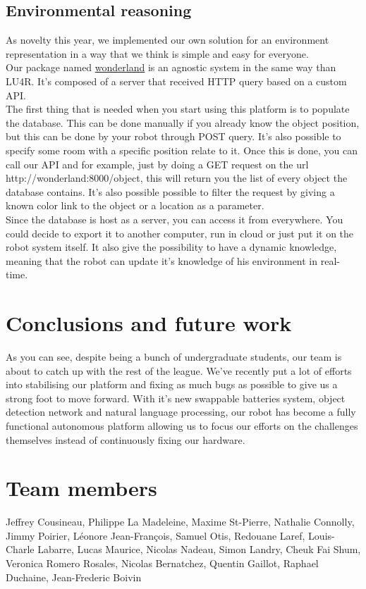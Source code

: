 \documentclass[runningheads,a4paper]{llncs}
\begin{document}
\subsection{Environmental reasoning}
\tab As novelty this year, we implemented our own solution for an environment representation in a way that we think is simple and easy for everyone. \\

Our package named \href{http://github.com/walkingmachine/wonderland}{wonderland} is an agnostic system in the same way than LU4R. It’s composed of a server that received HTTP query based on a custom API. \\

The first thing that is needed when you start using this platform is to populate the database. This can be done manually if you already know the object position, but this can be done by your robot through POST query. It’s also possible to specify some room with a specific position relate to it. Once this is done, you can call our API and for example, just by doing a GET request on the url http://wonderland:8000/object, this will return you the list of every object the database contains. It’s also possible possible to filter the request by giving a known color link to the object or a location as a parameter. \\

Since the database is host as a server, you can access it from everywhere. You could decide to export it to another computer, run in cloud or just put it on the robot system itself. It also give the possibility to have a dynamic knowledge, meaning that the robot can update it’s knowledge of his environment in real-time. \\



\section{Conclusions and future work} 
\tab As you can see, despite being a bunch of undergraduate students, our team is about to catch up with the rest of the league. We’ve recently put a lot of efforts into stabilising our platform and fixing as much bugs as possible to give us a strong foot to move forward.
With it’s new swappable batteries system, object detection network and natural language processing, our robot has become a fully functional autonomous platform allowing us to focus our efforts on the challenges themselves instead of continuously fixing our hardware.
\\


	

\section*{Team members}
Jeffrey Cousineau, Philippe La Madeleine, Maxime St-Pierre, Nathalie Connolly, Jimmy Poirier, Léonore Jean-François, Samuel Otis, Redouane Laref, Louis-Charle Labarre, Lucas Maurice, Nicolas Nadeau, Simon Landry, Cheuk Fai Shum, Veronica Romero Rosales, Nicolas Bernatchez, Quentin Gaillot, Raphael Duchaine, Jean-Frederic Boivin 

\nocite{*}


\end{document}
